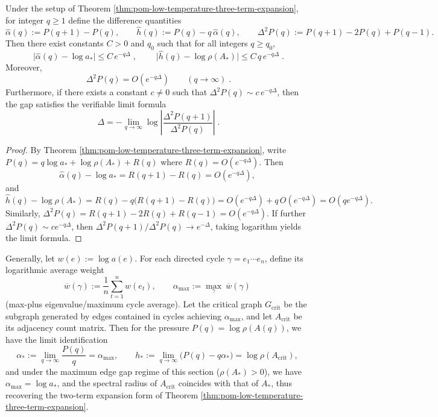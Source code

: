 \begin{theorem}\label{thm:pom-low-temperature-difference-certificates}
Under the setup of Theorem \ref{thm:pom-low-temperature-three-term-expansion}, for integer \(q\ge 1\) define the difference quantities
\[
\widehat\alpha(q):=P(q+1)-P(q),\qquad
\widehat h(q):=P(q)-q\,\widehat\alpha(q),\qquad
\Delta^2P(q):=P(q+1)-2P(q)+P(q-1).
\]
Then there exist constants \(C>0\) and \(q_0\) such that for all integers \(q\ge q_0\),
\[
\boxed{\;
\bigl|\widehat\alpha(q)-\log a_*\bigr|\le C\,e^{-q\Delta}\; },
\qquad
\boxed{\;
\bigl|\widehat h(q)-\log\rho(A_*)\bigr|\le C\,q\,e^{-q\Delta}\; }.
\]
Moreover,
\[
\boxed{\;
\Delta^2P(q)=O(e^{-q\Delta})\qquad(q\to\infty)\; }.
\]
Furthermore, if there exists a constant \(c\neq 0\) such that \(\Delta^2P(q)\sim c\,e^{-q\Delta}\), then the gap satisfies the verifiable limit formula
\[
\boxed{\;
\Delta=-\lim_{q\to\infty}\log\left|\frac{\Delta^2P(q+1)}{\Delta^2P(q)}\right|\; }.
\]
\end{theorem}
\begin{proof}
By Theorem \ref{thm:pom-low-temperature-three-term-expansion}, write
\(
P(q)=q\log a_*+\log\rho(A_*)+R(q)
\)
where \(R(q)=O(e^{-q\Delta})\).
Then
\[
\widehat\alpha(q)-\log a_*=R(q+1)-R(q)=O(e^{-q\Delta}),
\]
and
\[
\widehat h(q)-\log\rho(A_*)
=R(q)-q\bigl(R(q+1)-R(q)\bigr)
=O(e^{-q\Delta})+q\,O(e^{-q\Delta})
=O(qe^{-q\Delta}).
\]
Similarly,
\(
\Delta^2P(q)=R(q+1)-2R(q)+R(q-1)=O(e^{-q\Delta})
\).
If further \(\Delta^2P(q)\sim c e^{-q\Delta}\), then
\(
\Delta^2P(q+1)/\Delta^2P(q)\to e^{-\Delta}
\),
taking logarithm yields the limit formula.
\end{proof}

\begin{remark}\label{rem:pom-tropical-perron-binary-identification}
Generally, let \(w(e):=\log a(e)\). For each directed cycle \(\gamma=e_1\cdots e_n\), define its logarithmic average weight
\[
\overline{w}(\gamma):=\frac{1}{n}\sum_{t=1}^{n}w(e_t),
\qquad
\alpha_{\max}:=\max_{\gamma}\ \overline{w}(\gamma)
\]
(max-plus eigenvalue/maximum cycle average).
Let the critical graph \(G_{\mathrm{crit}}\) be the subgraph generated by edges contained in cycles achieving \(\alpha_{\max}\), and let \(A_{\mathrm{crit}}\) be its adjacency count matrix.
Then for the pressure \(P(q)=\log\rho(A(q))\), we have the limit identification
\[
\alpha_\ast:=\lim_{q\to\infty}\frac{P(q)}{q}=\alpha_{\max},
\qquad
h_\ast:=\lim_{q\to\infty}\bigl(P(q)-q\alpha_\ast\bigr)=\log\rho(A_{\mathrm{crit}}),
\]
and under the maximum edge gap regime of this section (\(\rho(A_*)>0\)), we have \(\alpha_{\max}=\log a_*\), and the spectral radius of \(A_{\mathrm{crit}}\) coincides with that of \(A_*\), thus recovering the two-term expansion form of Theorem \ref{thm:pom-low-temperature-three-term-expansion}.
\end{remark}

